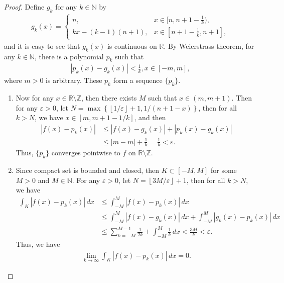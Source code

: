 \documentclass[11pt]{article}
\theoremstyle{definition}
\numberwithin{equation}{subsection}
\begin{document}
\begin{proof}
Define $g_k$ for any $k \in \mathbb{N}$ by
\begin{align*}
    g_k(x) = \begin{cases}
        n, & x \in [n, n+1-\frac{1}{k}), \\
        kx - (k-1)(n+1), & x \in [n+1-\frac{1}{k}, n+1],
    \end{cases}
\end{align*}
and it is easy to see that $g_k(x)$ is continuous on $\mathbb{R}$. By Weierstrass theorem, for any $k \in \mathbb{N}$, there is a polynomial $p_k$ such that 
\begin{align*}
    \left| p_k(x) - g_k(x) \right| < \frac{1}{k}, x \in [-m, m],
\end{align*}
where $m > 0$ is arbitrary. These $p_k$ form a sequence $\{p_k\}$. 
\begin{enumerate}[label=(\alph*)]
    \item Now for any $x \in \mathbb{R}\setminus \mathbb{Z}$, then there exists $M$ such that $x \in (m, m+1)$. Then for any $\varepsilon > 0$, let $N = \max\left\{\left\lfloor 1/\varepsilon \right\rfloor + 1, 1/(n + 1 - x) \right\}$, then for all $k > N$, we have $x \in [m, m + 1 - 1/k]$, and then
    \begin{align*}
        \left| f(x) - p_k(x) \right| & \leq \left| f(x) - g_k(x) \right| + \left| p_k(x) - g_k(x) \right| \\
        & \leq |m - m| + \frac{1}{k} = \frac{1}{k} < \varepsilon.
    \end{align*}
    Thus, $\{p_k\}$ converges pointwise to $f$ on $\mathbb{R}\setminus \mathbb{Z}$. 
    
    \item Since compact set is bounded and closed, then $K \subset [-M, M]$ for some $M > 0$ and $M \in \mathbb{N}$. For any $\varepsilon > 0$, let $N = \left\lfloor 3M/\varepsilon \right\rfloor + 1$, then for all $k > N$, we have
    \begin{align*}
        \int_K \left| f(x) - p_k(x) \right|\, dx & \leq \int^{M}_{-M} \left| f(x) - p_k(x) \right|\, dx \\
        & \leq \int^{M}_{-M} \left| f(x) - g_k(x) \right|\, dx + \int^{M}_{-M} \left| g_k(x) - p_k(x) \right|\, dx \\
        & \leq \sum^{M-1}_{k=-M} \frac{1}{2k} + \int^{M}_{-M} \frac{1}{k} \, dx < \frac{3M}{k} < \varepsilon.
    \end{align*}
    Thus, we have
    \begin{align*}
        \lim_{k\to\infty} \int_K \left| f(x) - p_k(x) \right|\, dx = 0.
    \end{align*}
\end{enumerate}
\end{proof}
\end{document}
